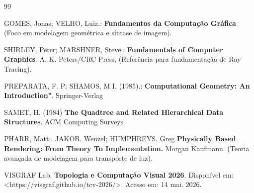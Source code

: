 \documentclass[11pt,a4paper]{article}
\theoremstyle{plain}
\theoremstyle{definition}
\begin{document}
\begin{thebibliography}{99}

GOMES, Jonas; VELHO, Luiz.: \textbf{Fundamentos da Computação Gráfica} (Foco em modelagem geométrica e síntase de imagem).

SHIRLEY, Peter; MARSHNER, Steve.: \textbf{Fundamentals of Computer Graphics}. A. K. Peters/CRC Press, (Referência para fundamentação de Ray Tracing).

PREPARATA, F. P; SHAMOS, M I. (1985).: \textbf{Computational Geometry: An Introduction"}. Springer-Verlag

SAMET, H. (1984) \textbf{The Quadtree and Related Hierarchical Data Structures}. ACM Computing Surveys

PHARR, Matt:, JAKOB. Wenzel; HUMPHREYS. Greg \textbf{Physically Based Rendering: From Theory To Implementation. } Morgan Kaufmann. (Teoria avançada de modelagem para transporte de luz).

VISGRAF Lab. \textbf{Topologia e Computação Visual 2026}. Disponível em: <https://visgraf.github.io/tcv-2026/>. Acesso em: 14 mai. 2026.

\end{thebibliography}
\end{document}
